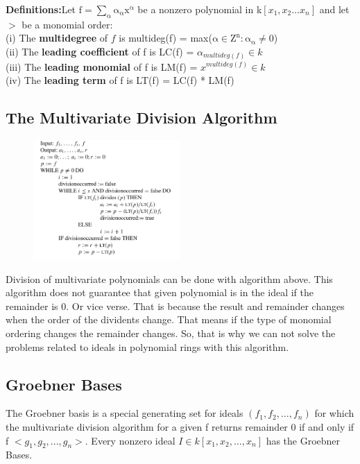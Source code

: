 \documentclass[11pt]{article}
\begin{document}
\textbf{Definitions:}Let $\mathrm{f=\sum_{\alpha}\alpha_\alpha x^\alpha}$ be a nonzero polynomial in k$[x_1,x_2 \ldots x_n]$ and let $>$ be a monomial order:\\
(i) The \textbf{multidegree} of $f$ is multideg(f) = max($\mathrm{\alpha \in Z^n:\alpha_\alpha \neq 0}$) \\
(ii) The \textbf{leading coefficient} of f is LC(f) = $\alpha_{multideg(f) }\in k$\\
(iii) The \textbf{leading monomial} of f is LM(f) = $x^{multideg(f)}\in k$\\
(iv) The \textbf{leading term} of f is LT(f) = LC(f) * LM(f)\\

\subsection{The Multivariate Division Algorithm}
\begin{figure}[H]
  \begin{center}
    \includegraphics[width=0.50\textwidth]{MultivariateDivisionAlgorithm.jpg}
    \caption{}
    \label{fig: }
  \end{center}
\end{figure}

Division of multivariate polynomials can be done with algorithm above. This algorithm does not guarantee that given polynomial is in the ideal if the remainder is 0. Or vice verse. That is because the result and remainder changes when the order of the dividents change. That means if the type of monomial ordering changes the remainder changes. So, that is why we can not solve the problems related to ideals in polynomial rings with this algorithm.

\subsection{Groebner Bases}

The Groebner basis is a special generating set for ideals $(f_1,f_2,\ldots,f_n)$ for which the multivariate division algorithm for a given f returns remainder 0 if and only if f \in $<g_1,g_2,...,g_n>$. Every nonzero ideal $I \in k[x_1,x_2,\ldots,x_n]$ has the Groebner Bases. \\
\end{document}
